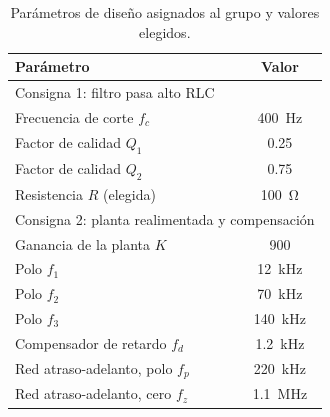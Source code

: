 \begin{table}[!ht]
  \centering
  \begin{tabular}{|l|c|}
    \hline
    Parámetro & Valor \\
    \hline
    \multicolumn{2}{|l|}{Consigna 1: filtro pasa alto RLC} \\
    \hline
    Frecuencia de corte $f_c$                        & \qty{400}{\hertz} \\
    Factor de calidad $Q_1$                          & \num{0.25} \\
    Factor de calidad $Q_2$                          & \num{0.75} \\
    Resistencia $R$ (elegida)                        & \qty{100}{\ohm} \\
    \hline
    \multicolumn{2}{|l|}{Consigna 2: planta realimentada y compensación} \\
    \hline
    Ganancia de la planta $K$                        & \num{900} \\
    Polo $f_1$                                       & \qty{12}{\kilo\hertz} \\
    Polo $f_2$                                       & \qty{70}{\kilo\hertz} \\
    Polo $f_3$                                       & \qty{140}{\kilo\hertz} \\
    Compensador de retardo $f_d$                     & \qty{1.2}{\kilo\hertz} \\
    Red atraso-adelanto, polo $f_p$                  & \qty{220}{\kilo\hertz} \\
    Red atraso-adelanto, cero $f_z$                  & \qty{1.1}{\mega\hertz} \\
    \hline
  \end{tabular}
  \caption{Parámetros de diseño asignados al grupo y valores elegidos.}
  \label{tab:parametros}
\end{table}


